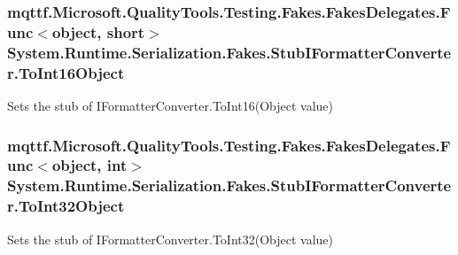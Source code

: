 \hypertarget{class_system_1_1_runtime_1_1_serialization_1_1_fakes_1_1_stub_i_formatter_converter_a003b2df86700e3eca33de816acbf9b45}{
\subsubsection[{To\-Int16\-Object}]{\setlength{\rightskip}{0pt plus 5cm}mqttf.\-Microsoft.\-Quality\-Tools.\-Testing.\-Fakes.\-Fakes\-Delegates.\-Func$<$object, short$>$ System.\-Runtime.\-Serialization.\-Fakes.\-Stub\-I\-Formatter\-Converter.\-To\-Int16\-Object}}\label{class_system_1_1_runtime_1_1_serialization_1_1_fakes_1_1_stub_i_formatter_converter_a003b2df86700e3eca33de816acbf9b45}


Sets the stub of I\-Formatter\-Converter.\-To\-Int16(\-Object value)

\hypertarget{class_system_1_1_runtime_1_1_serialization_1_1_fakes_1_1_stub_i_formatter_converter_acb3b74609c8d887f2927f62f61ba18a6}{
\subsubsection[{To\-Int32\-Object}]{\setlength{\rightskip}{0pt plus 5cm}mqttf.\-Microsoft.\-Quality\-Tools.\-Testing.\-Fakes.\-Fakes\-Delegates.\-Func$<$object, int$>$ System.\-Runtime.\-Serialization.\-Fakes.\-Stub\-I\-Formatter\-Converter.\-To\-Int32\-Object}}\label{class_system_1_1_runtime_1_1_serialization_1_1_fakes_1_1_stub_i_formatter_converter_acb3b74609c8d887f2927f62f61ba18a6}


Sets the stub of I\-Formatter\-Converter.\-To\-Int32(\-Object value)

